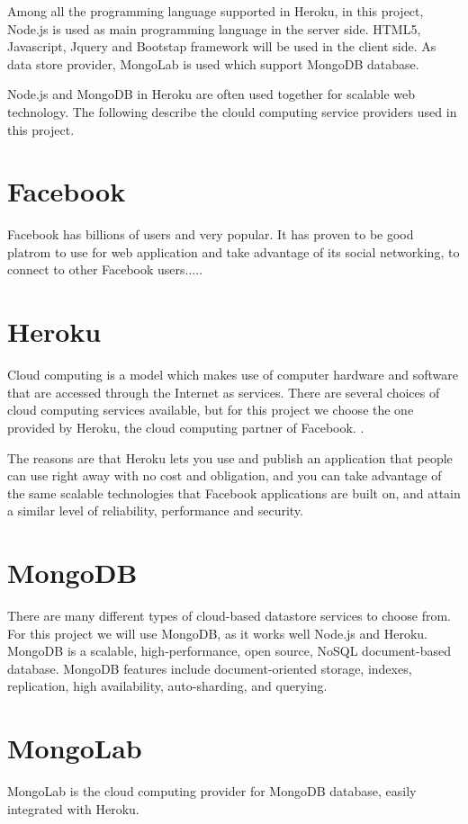Among all the programming language supported in Heroku, in this project, Node.js is used as main programming language in the server side. HTML5, Javascript, Jquery and Bootstap framework will be used in the client side. As data store provider, MongoLab is used which support MongoDB database. 

Node.js and MongoDB in Heroku are often used together for scalable web technology. The following describe the clould computing service providers used in this project.

\section{Facebook}
Facebook has billions of users and very popular. It has proven to be good platrom to use for web application and take advantage of its social networking, to connect to other Facebook users..... 

\section{Heroku}
Cloud computing is a model which makes use of computer hardware and software that are accessed through the Internet as services. There are several choices of cloud computing services available, but for this project we choose the one provided by Heroku, the cloud computing partner of Facebook. \cite{Heroku}.

The reasons are that Heroku lets you use and publish an application that people can use right away with no cost and obligation, and you can take advantage of the same scalable technologies that Facebook applications are built on, and attain a similar level of reliability, performance and security. 

\section{MongoDB}
There are many different types of cloud-based datastore services to choose from. For this project we will use MongoDB, as it works well Node.js and Heroku. MongoDB is a scalable, high-performance, open source, NoSQL document-based database. MongoDB features include document-oriented storage, indexes, replication, high availability, auto-sharding, and querying.

\section{MongoLab}
MongoLab is the cloud computing provider for MongoDB database, easily integrated with Heroku.

